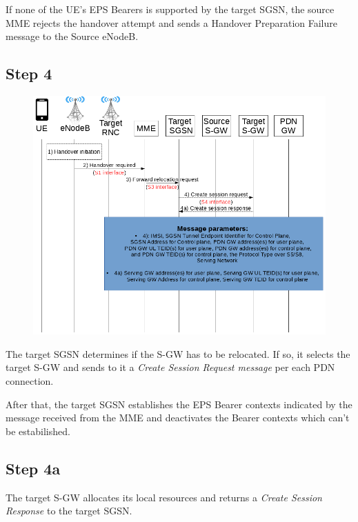  If none of the UE's EPS Bearers is supported by the target SGSN, the source MME
 rejects the handover attempt and sends a Handover Preparation Failure message to the
 Source eNodeB.

\newpage
\subsection*{Step 4}
\begin{figure}[!htb]
	\centering
	\includegraphics[width=0.9\linewidth]{img/4.png}
	\label{fig:4}
\end{figure}
The target SGSN determines if the S-GW has to be relocated. If so,
it selects the target S-GW and sends to it a \emph{Create Session Request message} per
each PDN connection.

After that, the target SGSN establishes the EPS Bearer contexts indicated by
the message received from the MME and deactivates the Bearer contexts which can't be
estabilished.


\subsection*{Step 4a}
The target S-GW allocates its local resources and returns a
\emph{Create Session Response} to the target SGSN.


